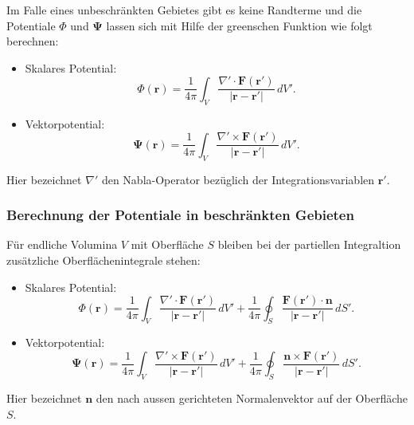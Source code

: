 Im Falle eines unbeschränkten Gebietes gibt es keine Randterme und
die Potentiale $\Phi$ und $\boldsymbol{\Psi}$ lassen sich mit Hilfe
der greenschen Funktion wie folgt berechnen:
\begin{itemize}
\item Skalares Potential:
\begin{equation*}
\Phi(\boldsymbol{r})
=
\frac{1}{4 \pi}
\int_{V}
\frac{\nabla' \cdot \boldsymbol{F}(\boldsymbol{r}')}{|\boldsymbol{r} - \boldsymbol{r}'|}
\,dV'\!.
\end{equation*}

\item Vektorpotential:
\begin{equation*}
\boldsymbol{\Psi}(\boldsymbol{r})
=
\frac{1}{4 \pi}
\int_{V}
\frac{\nabla' \times \boldsymbol{F}(\boldsymbol{r}')}{|\boldsymbol{r} - \boldsymbol{r}'|}
\,dV'\!.
\end{equation*}
\end{itemize}
Hier bezeichnet $\nabla'$ den Nabla-Operator bezüglich der
Integrationsvariablen $\boldsymbol{r}'$.

\subsubsection{Berechnung der Potentiale in beschränkten Gebieten}
Für endliche Volumina $V$ mit Oberfläche $S$ bleiben bei der partiellen
Integraltion zusätzliche Oberflächenintegrale stehen:
\begin{itemize}
\item Skalares Potential:
\begin{equation*}
\Phi (\boldsymbol{r})
=
\frac{1}{4\pi}
\int_V
\frac{\nabla' \cdot \boldsymbol{F}(\boldsymbol{r}')}{|\boldsymbol{r} - \boldsymbol{r}'|}
\,dV'
+
\frac{1}{4\pi}
\oint_S \frac{\boldsymbol{F}(\boldsymbol{r}') \cdot \boldsymbol{n}}{|\boldsymbol{r} - \boldsymbol{r}'|}
\,dS'\!.
\end{equation*}

\item Vektorpotential:
\begin{equation*}
\boldsymbol{\Psi}(\boldsymbol{r})
=
\frac{1}{4\pi}
\int_V
\frac{\nabla' \times \boldsymbol{F}(\boldsymbol{r}')}{|\boldsymbol{r} - \boldsymbol{r}'|}
\,dV'
+
\frac{1}{4\pi}
\oint_S
\frac{\boldsymbol{n} \times \boldsymbol{F}(\boldsymbol{r}')}{|\boldsymbol{r} - \boldsymbol{r}'|}
\,dS'\!.
\end{equation*}
\end{itemize}
Hier bezeichnet $\boldsymbol{n}$ den nach aussen gerichteten
Normalenvektor auf der Oberfläche $S$\!.

